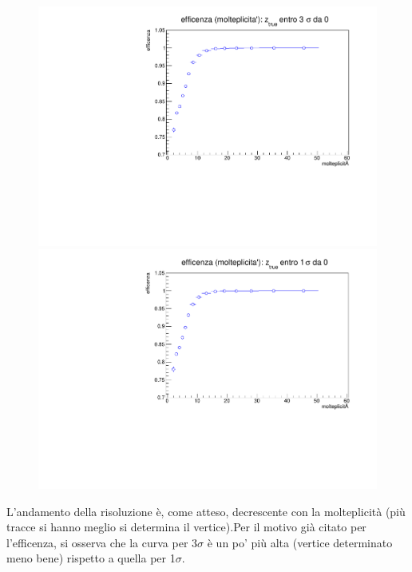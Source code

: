 \documentclass{article}
\begin{document}
\begin{figure}[H]
	\includegraphics[scale=0.4]{effmultifunc3sigma}
	
	\endminipage\hfill
	\includegraphics[scale=0.42]{effmultifunc1sigma}
	
	\endminipage
	
	
\end{figure}
\noindent
L'andamento della risoluzione è, come atteso, decrescente con la molteplicità (più tracce si hanno meglio si determina il vertice).Per il motivo già citato per l'efficenza, si osserva che la curva per 3$\sigma$ è un po' più alta (vertice determinato meno bene) rispetto a quella per 1$\sigma$.
\end{document}
